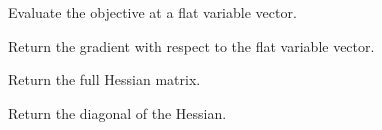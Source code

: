 \documentclass[letterpaper,10pt,english,openany,oneside]{sphinxmanual}
\begin{document}
\begin{fulllineitems}
\begin{fulllineitems}
\pysigstartsignatures
{}
\pysigstopsignatures
\end{fulllineitems}



\begin{fulllineitems}

\pysigstartsignatures
{}
\pysigstopsignatures
\sphinxAtStartPar
Evaluate the objective at a flat variable vector.

\end{fulllineitems}



\begin{fulllineitems}

\pysigstartsignatures
{}
\pysigstopsignatures
\sphinxAtStartPar
Return the gradient with respect to the flat variable vector.

\end{fulllineitems}



\begin{fulllineitems}

\pysigstartsignatures
{}
\pysigstopsignatures
\sphinxAtStartPar
Return the full Hessian matrix.

\end{fulllineitems}



\begin{fulllineitems}

\pysigstartsignatures
{}
\pysigstopsignatures
\sphinxAtStartPar
Return the diagonal of the Hessian.

\end{fulllineitems}


\end{fulllineitems}
\end{document}

